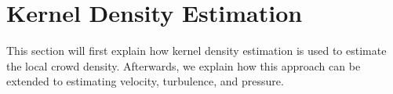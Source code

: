 \section{Kernel Density Estimation}


This section will first explain how kernel density estimation is used to estimate the local crowd density. Afterwards, we explain how this approach can be extended to estimating velocity, turbulence, and pressure.







